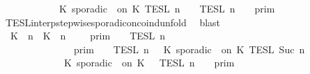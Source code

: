 \begin{isabellebody}
\ \ \ \ \ \ \ \ \ \ {\isacharequal}\ {\isasymlbrakk}\ K\ sporadic\ {\isasymtau}\ on\ K\ {\isasymrbrakk}\isactrlsub T\isactrlsub E\isactrlsub S\isactrlsub L\isactrlbsup {\isasymge}\ n\isactrlesup \ {\isasyminter}\ {\isacharparenleft}{\isasymlbrakk}{\isasymlbrakk}\ {\isasymPsi}\ {\isasymrbrakk}{\isasymrbrakk}\isactrlsub T\isactrlsub E\isactrlsub S\isactrlsub L\isactrlbsup {\isasymge}\ n\isactrlesup \ {\isasyminter}\ {\isasymlbrakk}{\isasymlbrakk}\ {\isasymGamma}\ {\isasymrbrakk}{\isasymrbrakk}\isactrlsub p\isactrlsub r\isactrlsub i\isactrlsub m{\isacharparenright}{\isacartoucheclose}\isanewline
\ \ \ \ \ \ \isamarkupfalse%
\ TESL{\isacharunderscore}interp{\isacharunderscore}stepwise{\isacharunderscore}sporadicon{\isacharunderscore}coind{\isacharunderscore}unfold\ \isamarkupfalse%
\ blast\isanewline
\ \ \ \ \isamarkupfalse%
\ {\isacartoucheopen}{\isasymlbrakk}{\isasymlbrakk}\ {\isacharparenleft}{\isacharparenleft}K\ {\isasymUp}\ n{\isacharparenright}\ {\isacharhash}\ {\isacharparenleft}K\ {\isasymDown}\ n\ {\isacharat}\ {\isasymtau}{\isacharparenright}\ {\isacharhash}\ {\isasymGamma}{\isacharparenright}\ {\isasymrbrakk}{\isasymrbrakk}\isactrlsub p\isactrlsub r\isactrlsub i\isactrlsub m\ {\isasyminter}\ {\isasymlbrakk}{\isasymlbrakk}\ {\isasymPsi}\ {\isasymrbrakk}{\isasymrbrakk}\isactrlsub T\isactrlsub E\isactrlsub S\isactrlsub L\isactrlbsup {\isasymge}\ n\isactrlesup \isanewline
\ \ \ \ \ \ \ \ \ \ \ \ {\isasymunion}\ {\isasymlbrakk}{\isasymlbrakk}\ {\isasymGamma}\ {\isasymrbrakk}{\isasymrbrakk}\isactrlsub p\isactrlsub r\isactrlsub i\isactrlsub m\ {\isasyminter}\ {\isasymlbrakk}{\isasymlbrakk}\ {\isasymPsi}\ {\isasymrbrakk}{\isasymrbrakk}\isactrlsub T\isactrlsub E\isactrlsub S\isactrlsub L\isactrlbsup {\isasymge}\ n\isactrlesup \ {\isasyminter}\ {\isasymlbrakk}\ K\ sporadic\ {\isasymtau}\ on\ K\ {\isasymrbrakk}\isactrlsub T\isactrlsub E\isactrlsub S\isactrlsub L\isactrlbsup {\isasymge}\ Suc\ n\isactrlesup \isanewline
\ \ \ \ \ \ \ \ \ \ \ {\isacharequal}\ {\isasymlbrakk}{\isasymlbrakk}\ {\isacharparenleft}K\ sporadic\ {\isasymtau}\ on\ K\ {\isacharhash}\ {\isasymPsi}\ {\isasymrbrakk}{\isasymrbrakk}\isactrlsub T\isactrlsub E\isactrlsub S\isactrlsub L\isactrlbsup {\isasymge}\ n\isactrlesup \ {\isasyminter}\ {\isasymlbrakk}{\isasymlbrakk}\ {\isasymGamma}\ {\isasymrbrakk}{\isasymrbrakk}\isactrlsub p\isactrlsub r\isactrlsub i\isactrlsub m{\isacartoucheclose}\ \isamarkupfalse%

\end{isabellebody}
